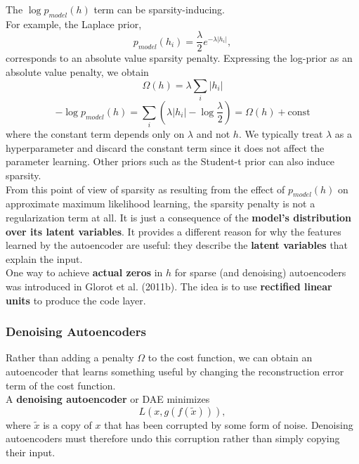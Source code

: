 \documentclass[11pt]{article}
\begin{document}
The \(\log p_{model}(h)\) term can be sparsity-inducing.\\
For example, the Laplace prior,\\
\begin{equation}
p_{model}(h_i) = \frac{\lambda}{2} e^{-\lambda|h_i|},
\end{equation}
corresponds to an absolute value sparsity penalty. Expressing the log-prior as an absolute value penalty, we obtain\\
\begin{equation}
\Omega(h) = \lambda \sum_i |h_i|
\end{equation}
\begin{equation}
-\log p_{model}(h) = \sum_i(\lambda|h_i| - \log\frac{\lambda}{2}) = \Omega(h) + \mathrm{const}
\end{equation}
where the constant term depends only on \(\lambda\) and not \(h\). We typically treat \(\lambda\) as a hyperparameter and discard the constant term since it does not affect the parameter learning. Other priors such as the Student-t prior can also induce sparsity.\\

From this point of view of sparsity as resulting from the effect of \(p_{model}(h)\) on approximate maximum likelihood learning, the sparsity penalty is not a regularization term at all. It is just a consequence of the \textbf{model’s distribution over its latent variables}. It provides a different reason for why the features learned by the autoencoder are useful: they describe the \textbf{latent variables} that explain the input.\\


One way to achieve \textbf{actual zeros} in \(h\) for sparse (and denoising) autoencoders was introduced in Glorot et al. (2011b). The idea is to use \textbf{rectified linear units} to produce the code layer.\\


\subsubsection{Denoising Autoencoders}
\label{sec:org7e8cec5}
Rather than adding a penalty \(\Omega\) to the cost function, we can obtain an autoencoder that learns something useful by changing the reconstruction error term of the cost function.\\


A \textbf{denoising autoencoder} or DAE minimizes\\
\begin{equation}
L(x,g(f(\tilde{x}))),
\end{equation}
where \(\tilde{x}\) is a copy of \(x\) that has been corrupted by some form of noise. Denoising autoencoders must therefore undo this corruption rather than simply copying their input.\\
\end{document}
